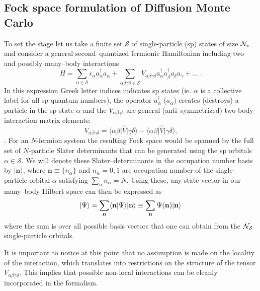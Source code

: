 \subsection{Fock space formulation of Diffusion Monte Carlo}
To set the stage let us take a finite set $\mathcal{S}$ of single-particle (sp) states of size ${\cal N}_s$ and 
consider a general second--quantized fermionic Hamiltonian including two and possibly many--body interactions
\begin{equation}
H=\sum_{\alpha \in \mathcal{S}} \epsilon_\alpha a^{\dagger}_\alpha a_\alpha + \sum_{\alpha\beta\gamma\delta\in \mathcal{S}} V_{\alpha\beta\gamma\delta} a^{\dagger}_\alpha a^{\dagger}_\beta a_\delta a_\gamma + \dots \;.
\end{equation}
In this expression Greek letter indices indicates sp states (ie. $\alpha$ is a collective label for all sp quantum 
numbers), the operator $a^{\dagger}_\alpha$ ($a_\alpha$) creates (destroys) a particle in the sp state $\alpha$ 
and the $V_{\alpha\beta\gamma\delta}$ are general (anti--symmetrized) two-body interaction matrix elements:
\begin{equation}
V_{\alpha\beta\gamma\delta} = \langle \alpha \beta \lvert \hat{V} \rvert \gamma \delta \rangle - \langle \alpha \beta \lvert \hat{V} \rvert \gamma \delta \rangle .%
\end{equation}.
For an $N$-fermion system the resulting Fock space would be spanned by the full set of $N$-particle 
Slater determinants that can be generated using the sp orbitals $\alpha \in \mathcal{S}$. We will denote these 
Slater--determinants in the occupation number basis by $\rvert \mathbf{n} \rangle$, where $\mathbf{n} \equiv \{ n_\alpha \}$ and $n_\alpha = 0,1$ 
are occupation number of the single--particle orbital $\alpha$ satisfying $\sum_\alpha n_\alpha=N$.
Using these, any state vector in our many--body Hilbert space can then be expressed as
\begin{equation}
\lvert \Psi \rangle = \sum_{\bf n} \langle \mathbf{n} \vert \Psi \rangle \lvert \mathbf{n} \rangle \equiv \sum_{\bf n} \Psi(\bf{n}) \lvert {\bf n} \rangle
\end{equation}
where the sum is over all possible basis vectors that one can obtain from the ${\cal N_S}$ single-particle orbitals.

It is important to notice at this point that no assumption is made on the locality of the 
interaction, which translates into restrictions on the structure of the tensor $V_{\alpha\beta\gamma\delta}$. This 
implies that possible non-local interactions can be cleanly incorporated in the formalism.

